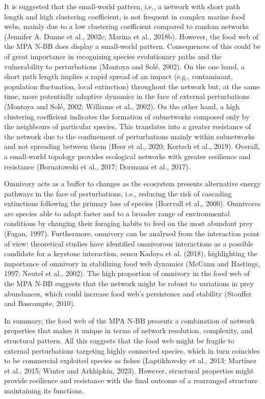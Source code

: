 \documentclass[preprint, 3p,
authoryear]{elsarticle} %
\begin{document}
It is suggested that the small-world pattern, i.e., a network with short
path length and high clustering coefficient, is not frequent in complex
marine food webs, mainly due to a low clustering coefficient compared to
random networks (Jennifer A. Dunne et al., 2002c; Marina et al., 2018b).
However, the food web of the MPA N-BB does display a small-world
pattern. Consequences of this could be of great importance in
recognizing species evolutionary paths and the vulnerability to
perturbations (Montoya and Solé, 2002). On the one hand, a short path
length implies a rapid spread of an impact (e.g., contaminant,
population fluctuation, local extinction) throughout the network but, at
the same time, more potentially adaptive dynamics in the face of
external perturbations (Montoya and Solé, 2002; Williams et al., 2002).
On the other hand, a high clustering coefficient indicates the formation
of subnetworks composed only by the neighbours of particular species.
This translates into a greater resistance of the network due to the
confinement of perturbations mainly within subnetworks and not spreading
between them (Heer et al., 2020; Kortsch et al., 2019). Overall, a
small-world topology provides ecological networks with greater
resilience and resistance (Bornatowski et al., 2017; Dormann et al.,
2017).

Omnivory acts as a buffer to changes as the ecosystem presents
alternative energy pathways in the face of perturbations, i.e., reducing
the risk of cascading extinctions following the primary loss of species
(Borrvall et al., 2000). Omnivores are species able to adapt faster and
to a broader range of environmental conditions by changing their
foraging habits to feed on the most abundant prey (Fagan, 1997).
Furthermore, omnivory can be analysed from the interaction point of
view: theoretical studies have identified omnivorous interactions as a
possible candidate for a keystone interaction, sensu Kadoya et al.
(2018), highlighting the importance of omnivory in stabilizing food web
dynamics (McCann and Hastings, 1997; Neutel et al., 2002). The high
proportion of omnivory in the food web of the MPA N-BB suggests that the
network might be robust to variations in prey abundances, which could
increase food web's persistence and stability (Stouffer and Bascompte,
2010).

In summary, the food web of the MPA N-BB presents a combination of
network properties that makes it unique in terms of network resolution,
complexity, and structural pattern. All this suggests that the food web
might be fragile to external perturbations targeting highly connected
species, which in turn coincides to be commercial exploited species as
fishes (Laptikhovsky et al., 2013; Martínez et al., 2015; Winter and
Arkhipkin, 2023). However, structural properties might provide
resilience and resistance with the final outcome of a rearranged
structure maintaining its functions.
\end{document}
